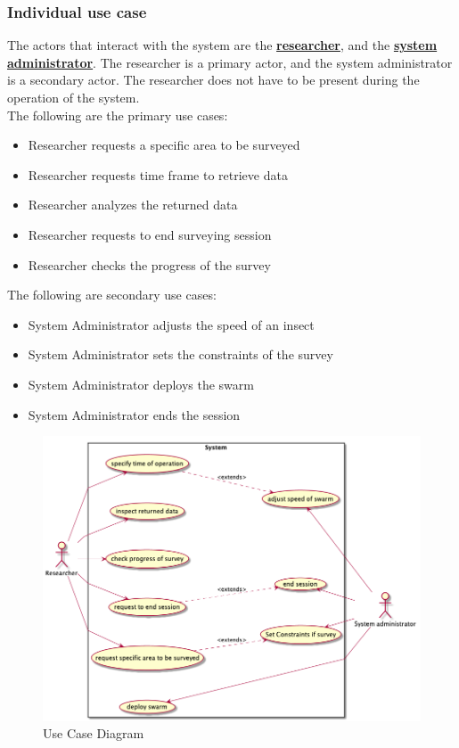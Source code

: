 \documentclass[11pt]{article}
\begin{document}
\subsubsection{Individual use case}
The actors that interact with the system are the \textbf{\hyperref[sec:definitions]{researcher}}, and the \textbf{\hyperref[sec:definitions]{system administrator}}. The researcher is a primary actor, and the system administrator is a secondary actor. The researcher does not have to be present during the operation of the system. \\
The following are the primary use cases:
\begin{itemize}
    \item Researcher requests a specific area to be surveyed
    \item Researcher requests time frame to retrieve data
    \item Researcher analyzes the returned data
    \item Researcher requests to end surveying session
    \item Researcher checks the progress of the survey
\end{itemize}
The following are secondary use cases:
\begin{itemize}
    \item System Administrator adjusts the speed of an insect
    \item System Administrator sets the constraints of the survey
    \item System Administrator deploys the swarm
    \item System Administrator ends the session
\end{itemize}
\begin{figure}[H]
   \centering
   \includegraphics[width=\textwidth]{diagrams/usecase.png}
   \caption{Use Case Diagram}
   \label{fig:ucd}
\end{figure}
\end{document}
